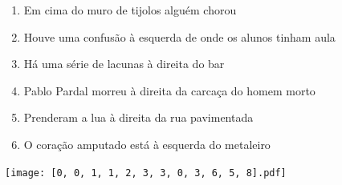 \documentclass[12pt]{article}
\begin{document}
		 

\pagebreak


	\begin{enumerate}
		  \sffamily %
		  \large %


\vfill \item
Em cima do muro de tijolos	%
alguém chorou	%

\vfill \item
Houve uma confusão	%
à esquerda
de onde os alunos tinham aula	%

\vfill \item
Há uma série de lacunas	%
à direita
do bar	%

\vfill \item
Pablo Pardal morreu	%
à direita
da carcaça do homem morto	%

\vfill \item
Prenderam a lua	%
à direita
da rua pavimentada	%

\vfill \item
O coração amputado está	%
à esquerda
do metaleiro	%
	\end{enumerate}
		  
		  \hfill

		  \vfill

\texttt{[image: [0, 0, 1, 1, 2, 3, 3, 0, 3, 6, 5, 8].pdf]}


	\hfill	  	  


\pagebreak			
\end{document}
